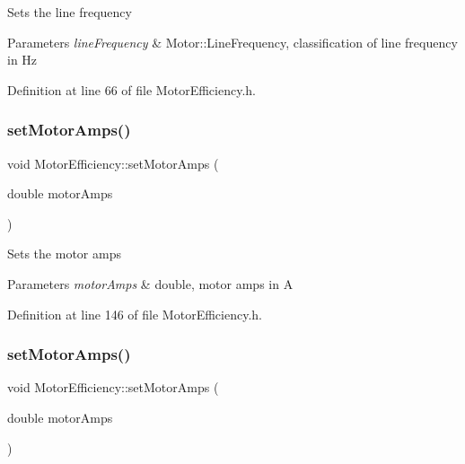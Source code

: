 Sets the line frequency 
\begin{DoxyParams}{Parameters}
{\em line\+Frequency} & Motor\+::\+Line\+Frequency, classification of line frequency in Hz \\
\hline
\end{DoxyParams}


Definition at line 66 of file Motor\+Efficiency.\+h.

\mbox{\label{class_motor_efficiency_ac86aa8d6162e63eb440e07e557534c74}} 
\subsubsection{\texorpdfstring{set\+Motor\+Amps()}{setMotorAmps()}\hspace{0.1cm}{\footnotesize\ttfamily [1/3]}}
{\footnotesize\ttfamily void Motor\+Efficiency\+::set\+Motor\+Amps (\begin{DoxyParamCaption}\item[{double}]{motor\+Amps }\end{DoxyParamCaption})\hspace{0.3cm}{\ttfamily [inline]}}

Sets the motor amps 
\begin{DoxyParams}{Parameters}
{\em motor\+Amps} & double, motor amps in A \\
\hline
\end{DoxyParams}


Definition at line 146 of file Motor\+Efficiency.\+h.

\mbox{\label{class_motor_efficiency_ac86aa8d6162e63eb440e07e557534c74}} 
\subsubsection{\texorpdfstring{set\+Motor\+Amps()}{setMotorAmps()}\hspace{0.1cm}{\footnotesize\ttfamily [2/3]}}
{\footnotesize\ttfamily void Motor\+Efficiency\+::set\+Motor\+Amps (\begin{DoxyParamCaption}\item[{double}]{motor\+Amps }\end{DoxyParamCaption})\hspace{0.3cm}{\ttfamily [inline]}}

